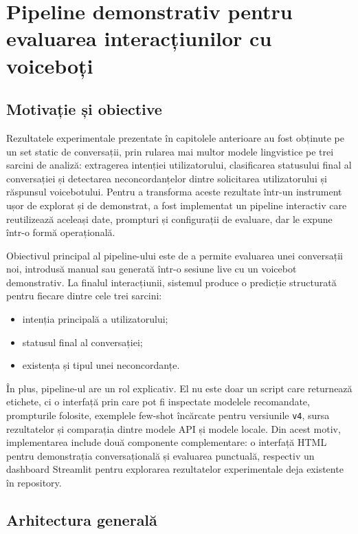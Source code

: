 \chapter{Pipeline demonstrativ pentru evaluarea interacțiunilor cu voiceboți}
\label{cap:demo-pipeline}

\section{Motivație și obiective}
\label{sec:demo-pipeline-motivatie}

Rezultatele experimentale prezentate în capitolele anterioare au fost obținute pe un set static de conversații, prin rularea mai multor modele lingvistice pe trei sarcini de analiză: extragerea intenției utilizatorului, clasificarea statusului final al conversației și detectarea neconcordanțelor dintre solicitarea utilizatorului și răspunsul voicebotului. Pentru a transforma aceste rezultate într-un instrument ușor de explorat și de demonstrat, a fost implementat un pipeline interactiv care reutilizează aceleași date, prompturi și configurații de evaluare, dar le expune într-o formă operațională.

Obiectivul principal al pipeline-ului este de a permite evaluarea unei conversații noi, introdusă manual sau generată într-o sesiune live cu un voicebot demonstrativ. La finalul interacțiunii, sistemul produce o predicție structurată pentru fiecare dintre cele trei sarcini:

\begin{itemize}
    \item intenția principală a utilizatorului;
    \item statusul final al conversației;
    \item existența și tipul unei neconcordanțe.
\end{itemize}

În plus, pipeline-ul are un rol explicativ. El nu este doar un script care returnează etichete, ci o interfață prin care pot fi inspectate modelele recomandate, prompturile folosite, exemplele few-shot încărcate pentru versiunile \texttt{v4}, sursa rezultatelor și comparația dintre modele API și modele locale. Din acest motiv, implementarea include două componente complementare: o interfață HTML pentru demonstrația conversațională și evaluarea punctuală, respectiv un dashboard Streamlit pentru explorarea rezultatelor experimentale deja existente în repository.

\section{Arhitectura generală}
\label{sec:demo-pipeline-arhitectura}

